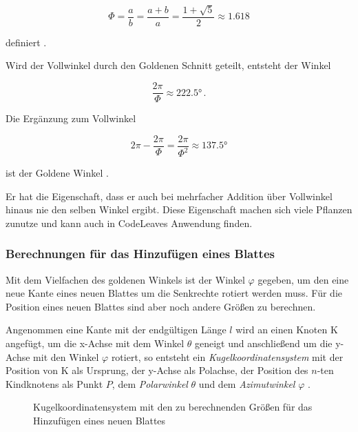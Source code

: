 \begin{equation}
  \Phi = \frac{a}{b} = \frac{a + b}{a} = \frac{1 + \sqrt{5}}{2} \approx 1.618
\end{equation}

\noindent definiert \cite{wolfram2017golden}.

Wird der Vollwinkel durch den Goldenen Schnitt geteilt, entsteht der Winkel

\begin{equation}
  \frac{2\pi}{\Phi} \approx \ang{222.5} \,.
\end{equation}

Die Ergänzung zum Vollwinkel

\begin{equation}
  2\pi - \frac{2\pi}{\Phi} = \frac{2\pi}{\Phi^2} \approx \ang{137.5}
\end{equation}

\noindent ist der Goldene Winkel \cite{wolfram2017golden}.

Er hat die Eigenschaft, dass er auch bei mehrfacher Addition über Vollwinkel hinaus nie den selben Winkel ergibt. Diese Eigenschaft machen sich viele Pflanzen zunutze und kann auch in CodeLeaves Anwendung finden.

\subsubsection*{Berechnungen für das Hinzufügen eines Blattes}
Mit dem Vielfachen des goldenen Winkels ist der Winkel $\varphi$ gegeben, um den eine neue Kante eines neuen Blattes um die Senkrechte rotiert werden muss. Für die Position eines neuen Blattes sind aber noch andere Größen zu berechnen.

Angenommen eine Kante mit der endgültigen Länge $l$ wird an einen Knoten K angefügt, um die x-Achse mit dem Winkel $\theta$ geneigt und anschließend um die y-Achse mit den Winkel $\varphi$ rotiert, so entsteht ein \textit{Kugelkoordinatensystem} mit der Position von K als Ursprung, der y-Achse als Polachse, der Position des $n$-ten Kindknotens als Punkt $P$, dem \emph{Polarwinkel} $\theta$ und dem \emph{Azimutwinkel} $\varphi$ \cite{papula2001mathematik}.

\begin{figure}[htb]
  
  \caption{Kugelkoordinatensystem mit den zu berechnenden Größen für das Hinzufügen eines neuen Blattes}
  \label{fig:spherical-coordinates}
\end{figure}

